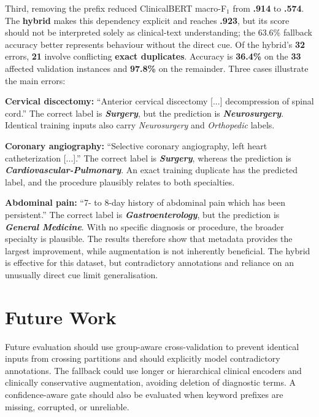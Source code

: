 \documentclass[twocolumn,10pt]{article}
\begin{document}
Third, removing the prefix reduced ClinicalBERT macro-F$_1$ from \textbf{.914} to \textbf{.574}. The \textbf{hybrid} makes this dependency explicit and reaches \textbf{.923}, but its score should not be interpreted solely as clinical-text understanding; the 63.6\% fallback accuracy better represents behaviour without the direct cue. Of the hybrid's \textbf{32} errors, \textbf{21} involve conflicting \textbf{exact duplicates}. Accuracy is \textbf{36.4\%} on the \textbf{33} affected validation instances and \textbf{97.8\%} on the remainder. Three cases illustrate the main errors:

\textbf{Cervical discectomy:}
``Anterior cervical discectomy [...] decompression of spinal cord.'' The correct label is \textit{\textbf{Surgery}}, but the prediction is \textit{\textbf{Neurosurgery}}. Identical training inputs also carry \textit{Neurosurgery} and \textit{Orthopedic} labels.

\textbf{Coronary angiography:}
``Selective coronary angiography, left heart catheterization [...].'' The correct label is \textit{\textbf{Surgery}}, whereas the prediction is \textit{\textbf{Cardiovascular-Pulmonary}}. An exact training duplicate has the predicted label, and the procedure plausibly relates to both specialties.

\textbf{Abdominal pain:}
``7- to 8-day history of abdominal pain which has been persistent.'' The correct label is \textit{\textbf{Gastroenterology}}, but the prediction is \textit{\textbf{General Medicine}}. With no specific diagnosis or procedure, the broader specialty is plausible.
The results therefore show that metadata provides the largest improvement, while augmentation is not inherently beneficial. The hybrid is effective for this dataset, but contradictory annotations and reliance on an unusually direct cue limit generalisation.
\vspace{-0.45cm}

\section*{\vspace{-0.35cm}Future Work}

Future evaluation should use group-aware cross-validation to prevent identical inputs from crossing partitions and should explicitly model contradictory annotations. The fallback could use longer or hierarchical clinical encoders and clinically conservative augmentation, avoiding deletion of diagnostic terms. A confidence-aware gate should also be evaluated when keyword prefixes are missing, corrupted, or unreliable.
\end{document}
